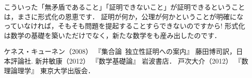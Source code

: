 \documentclass[./main]{subfiles}
\begin{document}
こういった「無矛盾であること」「証明できないこと」が証明できるということは，まさに形式化の恩恵です．
証明が何か，公理が何かということが明確になっていなければ，そもそも問題を提起することすらできないのですから!
形式化は数学の基礎を築いただけでなく，新たな数学をも産み出したのです．

\begin{thebibliography}{9}
 ケネス・キューネン（2008） 『集合論~独立性証明への案内』 藤田博司訳，日本評論社.
 新井敏康（2012） 『数学基礎論』 岩波書店．
 戸次大介（2012） 『数理論理学』 東京大学出版会．
\end{thebibliography}
\end{document}
